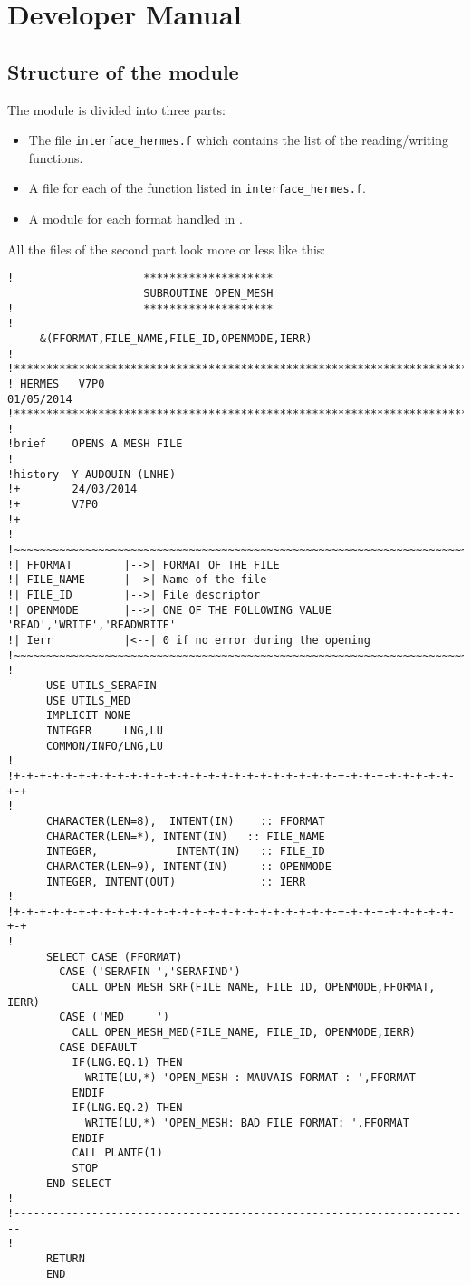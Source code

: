 \chapter{Developer Manual}
%

%
\section{Structure of the module}
%
The module is divided into three parts:
\begin{itemize}
\item The file \verb!interface_hermes.f! which contains the list of the
reading/writing functions.
\item A file for each of the function listed in \verb!interface_hermes.f!.
\item A module for each format handled in \telemacsystem.
\end{itemize}
%
All the files of the second part look more or less like this:
\begin{lstlisting}
!                    ********************
                     SUBROUTINE OPEN_MESH
!                    ********************
!
     &(FFORMAT,FILE_NAME,FILE_ID,OPENMODE,IERR)
!
!***********************************************************************
! HERMES   V7P0                                               01/05/2014
!***********************************************************************
!
!brief    OPENS A MESH FILE
!
!history  Y AUDOUIN (LNHE)
!+        24/03/2014
!+        V7P0
!+
!
!~~~~~~~~~~~~~~~~~~~~~~~~~~~~~~~~~~~~~~~~~~~~~~~~~~~~~~~~~~~~~~~~~~~~~~~
!| FFORMAT        |-->| FORMAT OF THE FILE
!| FILE_NAME      |-->| Name of the file
!| FILE_ID        |-->| File descriptor
!| OPENMODE       |-->| ONE OF THE FOLLOWING VALUE 'READ','WRITE','READWRITE'
!| Ierr           |<--| 0 if no error during the opening
!~~~~~~~~~~~~~~~~~~~~~~~~~~~~~~~~~~~~~~~~~~~~~~~~~~~~~~~~~~~~~~~~~~~~~~~
!
      USE UTILS_SERAFIN
      USE UTILS_MED
      IMPLICIT NONE
      INTEGER     LNG,LU
      COMMON/INFO/LNG,LU
!
!+-+-+-+-+-+-+-+-+-+-+-+-+-+-+-+-+-+-+-+-+-+-+-+-+-+-+-+-+-+-+-+-+-+-+-+
!
      CHARACTER(LEN=8),  INTENT(IN)    :: FFORMAT
      CHARACTER(LEN=*), INTENT(IN)   :: FILE_NAME
      INTEGER,            INTENT(IN)   :: FILE_ID
      CHARACTER(LEN=9), INTENT(IN)     :: OPENMODE
      INTEGER, INTENT(OUT)             :: IERR
!
!+-+-+-+-+-+-+-+-+-+-+-+-+-+-+-+-+-+-+-+-+-+-+-+-+-+-+-+-+-+-+-+-+-+-+-+
!
      SELECT CASE (FFORMAT)
        CASE ('SERAFIN ','SERAFIND')
          CALL OPEN_MESH_SRF(FILE_NAME, FILE_ID, OPENMODE,FFORMAT, IERR)
        CASE ('MED     ')
          CALL OPEN_MESH_MED(FILE_NAME, FILE_ID, OPENMODE,IERR)
        CASE DEFAULT
          IF(LNG.EQ.1) THEN
            WRITE(LU,*) 'OPEN_MESH : MAUVAIS FORMAT : ',FFORMAT
          ENDIF
          IF(LNG.EQ.2) THEN
            WRITE(LU,*) 'OPEN_MESH: BAD FILE FORMAT: ',FFORMAT
          ENDIF
          CALL PLANTE(1)
          STOP
      END SELECT
!
!-----------------------------------------------------------------------
!
      RETURN
      END
\end{lstlisting}
